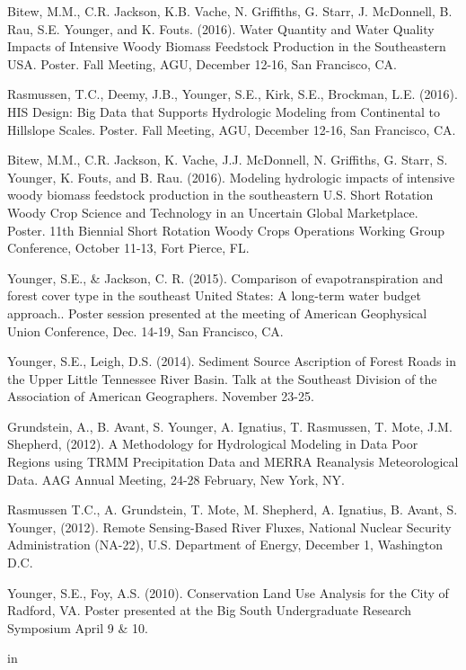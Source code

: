 \documentclass[10pt,letterpaper]{article}
\begin{document}
\begin{hangparas}{.25in}{1}
		Bitew, M.M., C.R. Jackson, K.B. Vache, N. Griffiths, G. Starr, J. McDonnell, B. Rau, S.E. Younger, and K. Fouts. (2016). Water Quantity and Water Quality Impacts of Intensive Woody Biomass Feedstock Production in the Southeastern USA. Poster. Fall Meeting, AGU, December 12-16, San Francisco, CA. 
		
		Rasmussen, T.C., Deemy, J.B., Younger, S.E., Kirk, S.E., Brockman, L.E. (2016). HIS Design: Big Data that Supports Hydrologic Modeling from Continental to Hillslope Scales. Poster. Fall Meeting, AGU, December 12-16, San Francisco, CA. 
		
		Bitew, M.M., C.R. Jackson, K. Vache, J.J. McDonnell, N. Griffiths, G. Starr, S. Younger, K. Fouts, and B. Rau. (2016). Modeling hydrologic impacts of intensive woody biomass feedstock production in the southeastern U.S. Short Rotation Woody Crop Science and Technology in an Uncertain Global Marketplace. Poster. 11th Biennial Short Rotation Woody Crops Operations Working Group Conference, October 11-13, Fort Pierce, FL.
		
		Younger, S.E., \& Jackson, C. R. (2015). Comparison of evapotranspiration and forest cover type in the southeast United States: A long-term water budget approach.. Poster session presented at the meeting of American Geophysical Union Conference, Dec. 14-19, San Francisco, CA.
		
		Younger, S.E., Leigh, D.S. (2014). Sediment Source Ascription of Forest Roads in the Upper Little Tennessee River Basin. Talk at the Southeast Division of the Association of American Geographers. November 23-25.
		
		Grundstein, A., B. Avant, S. Younger, A. Ignatius, T. Rasmussen, T. Mote, J.M. Shepherd, (2012). A Methodology for Hydrological Modeling in Data Poor Regions using TRMM Precipitation Data and MERRA Reanalysis Meteorological Data. AAG Annual Meeting, 24-28 February, New York, NY.
		
		Rasmussen T.C., A. Grundstein, T. Mote, M. Shepherd, A. Ignatius, B. Avant, S. Younger, (2012). Remote Sensing-Based River Fluxes, National Nuclear Security Administration (NA-22), U.S. Department of Energy, December 1, Washington D.C.
		
		Younger, S.E., Foy, A.S. (2010). Conservation Land Use Analysis for the City of Radford, VA. Poster presented at the Big South Undergraduate Research Symposium April 9 \& 10.
		
	\end{hangparas}
	
	 in
	
\end{document}
